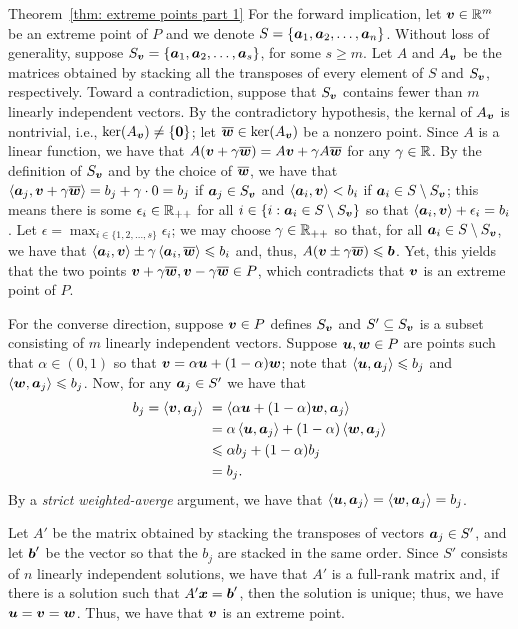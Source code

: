 \begin{proofof}{Theorem~\ref{thm: extreme points part 1}}
For the forward implication, let ${\boldsymbol v}\in\mathbb R^m$ be an extreme point of $P$ and we denote $S = \{{\boldsymbol a}_1, {\boldsymbol a}_2, \dots, {\boldsymbol a}_n\}$. Without loss of generality, suppose $S_{\boldsymbol v} = \{{\boldsymbol a}_1, {\boldsymbol a}_2, \dots, {\boldsymbol a}_s\}$, for some $s\geq m$. Let $A$ and $A_{\boldsymbol v}$ be the matrices obtained by stacking all the transposes of every element of $S$ and $S_{\boldsymbol v}$, respectively. Toward a contradiction, suppose that $S_{{\boldsymbol v}}$ contains fewer than $m$ linearly independent vectors. By the contradictory hypothesis, the kernal of $A_{\boldsymbol v}$ is nontrivial, i.e., $\ker(A_{\boldsymbol v})\neq \{\boldsymbol0\}$; let $\overline{{\boldsymbol w}}\in\ker(A_{\boldsymbol v})$ be a nonzero point. Since $A$ is a linear function, we have that $A({\boldsymbol v} + \gamma\overline{{\boldsymbol w}}) = A{\boldsymbol v} + \gamma A\overline{{\boldsymbol w}}$ for any $\gamma\in\mathbb R$. By the definition of $S_{\boldsymbol v}$ and by the choice of $\overline{{\boldsymbol w}}$, we have that $\left\langle{\boldsymbol a}_j, {\boldsymbol v} + \gamma\overline {{\boldsymbol w}}\right\rangle = b_j + \gamma \cdot 0 = b_j$ if ${\boldsymbol a}_j\in S_{\boldsymbol v}$ and $\left\langle{\boldsymbol a}_i, {\boldsymbol v}\right\rangle < b_i$ if ${\boldsymbol a}_i\in S\setminus S_{\boldsymbol v}$; this means there is some $\epsilon_i\in\mathbb R_{++}$ for all $i\in \{i: {\boldsymbol a}_i\in S\setminus S_{\boldsymbol v}\}$ so that $ \left\langle{\boldsymbol a}_i, {\boldsymbol v}\right\rangle + \epsilon_i = b_i $. 
Let $\epsilon = \max_{i\in\{1,2,\dots, s\}}{\epsilon_i}$; we may choose $\gamma \in \mathbb R_{++}$ so that, for all ${\boldsymbol a}_i\in S\setminus S_{\boldsymbol v}$, we have that $ \left\langle{\boldsymbol a}_i, {\boldsymbol v}\right\rangle \pm \gamma\left\langle {\boldsymbol a}_i, \overline{{\boldsymbol w}} \right\rangle\leqslant b_i $ and, thus, $A({\boldsymbol v} \pm \gamma\overline{{\boldsymbol w}}) \leqslant {\boldsymbol b}$. Yet, this yields that the two points ${\boldsymbol v} + \gamma\overline{{\boldsymbol w}}, {\boldsymbol v} - \gamma\overline{{\boldsymbol w}}\in P$, which contradicts that ${\boldsymbol v}$ is an extreme point of $P$. 

For the converse direction, suppose ${\boldsymbol v}\in P$ defines $S_{\boldsymbol v}$ and $S' \subseteq S_{\boldsymbol v}$ is a subset consisting of $m$ linearly independent vectors. Suppose ${\boldsymbol u}, {\boldsymbol w}\in P$ are points such that $\alpha\in(0, 1)$ so that ${\boldsymbol v} = \alpha {\boldsymbol u} + (1 - \alpha) {\boldsymbol w}$; note that $\left\langle{\boldsymbol u}, {\boldsymbol a}_j\right\rangle \leqslant b_j$ and $\left\langle{\boldsymbol w}, {\boldsymbol a}_j\right\rangle \leqslant b_j$. Now, for any ${\boldsymbol a}_j \in S'$ we have that 
\begin{equation*}\begin{split} 
b_j = \left\langle{\boldsymbol v}, {\boldsymbol a}_j\right\rangle~& = \left\langle \alpha {\boldsymbol u} + (1 - \alpha) {\boldsymbol w}, {\boldsymbol a}_j\right\rangle \\
& = \alpha \left\langle{\boldsymbol u}, {\boldsymbol a}_j\right\rangle  + (1 - \alpha)\left\langle{\boldsymbol w}, {\boldsymbol a}_j\right\rangle \\
& \leqslant  \alpha b_j  + (1 - \alpha)b_j \\
& = b_j. \end{split}\end{equation*}
By a {\em strict weighted-averge} argument, we have that $\left\langle{\boldsymbol u}, {\boldsymbol a}_j\right\rangle = \left\langle{\boldsymbol w}, {\boldsymbol a}_j\right\rangle = b_j$. 

Let $A'$ be the matrix obtained by stacking the transposes of vectors ${\boldsymbol a}_j\in S'$, and let ${\boldsymbol b}'$ be the vector so that the $b_j$ are stacked in the same order. Since $S'$ consists of $n$ linearly independent solutions, we have that $ A'$ is a full-rank matrix and, if there is a solution such that $A'{\boldsymbol x} = {\boldsymbol b}'$, then the solution is unique; thus, we have ${\boldsymbol u}={\boldsymbol v}={\boldsymbol w}$. Thus, we have that ${\boldsymbol v}$ is an extreme point.
\end{proofof}


